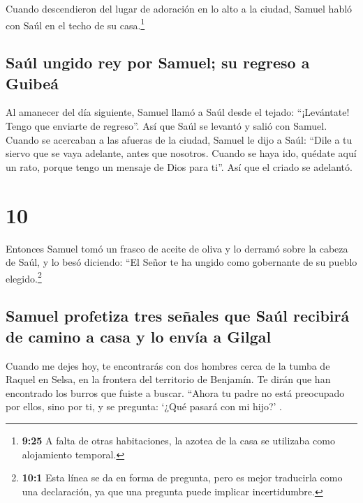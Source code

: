  Cuando descendieron del lugar de adoración en lo alto a
la ciudad, Samuel habló con Saúl en el techo de su casa.\footnote{\textbf{9:25}
  A falta de otras habitaciones, la azotea de la casa se utilizaba como
  alojamiento temporal.}

\hypertarget{sauxfal-ungido-rey-por-samuel-su-regreso-a-guibeuxe1}{%
\subsection{Saúl ungido rey por Samuel; su regreso a
Guibeá}\label{sauxfal-ungido-rey-por-samuel-su-regreso-a-guibeuxe1}}

 Al amanecer del día siguiente, Samuel llamó a Saúl desde
el tejado: ``¡Levántate! Tengo que enviarte de regreso''. Así que Saúl
se levantó y salió con Samuel.  Cuando se acercaban a las
afueras de la ciudad, Samuel le dijo a Saúl: ``Dile a tu siervo que se
vaya adelante, antes que nosotros. Cuando se haya ido, quédate aquí un
rato, porque tengo un mensaje de Dios para ti''. Así que el criado se
adelantó.

\hypertarget{section-9}{%
\section{10}\label{section-9}}

 Entonces Samuel tomó un frasco de aceite de oliva y lo
derramó sobre la cabeza de Saúl, y lo besó diciendo: ``El Señor te ha
ungido como gobernante de su pueblo elegido.\footnote{\textbf{10:1} Esta
  línea se da en forma de pregunta, pero es mejor traducirla como una
  declaración, ya que una pregunta puede implicar incertidumbre.}

\hypertarget{samuel-profetiza-tres-seuxf1ales-que-sauxfal-recibiruxe1-de-camino-a-casa-y-lo-envuxeda-a-gilgal}{%
\subsection{Samuel profetiza tres señales que Saúl recibirá de camino a
casa y lo envía a
Gilgal}\label{samuel-profetiza-tres-seuxf1ales-que-sauxfal-recibiruxe1-de-camino-a-casa-y-lo-envuxeda-a-gilgal}}

 Cuando me dejes hoy, te encontrarás con dos hombres cerca
de la tumba de Raquel en Selsa, en la frontera del territorio de
Benjamín. Te dirán que han encontrado los burros que fuiste a buscar.
``Ahora tu padre no está preocupado por ellos, sino por ti, y se
pregunta: `¿Qué pasará con mi hijo?' .

